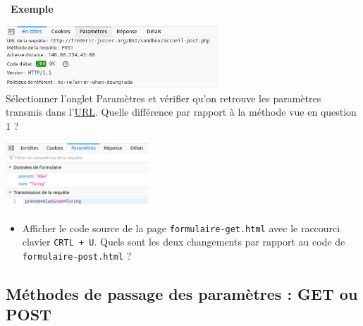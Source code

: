 \documentclass[
  11pt,
]{article}
\newcommand{\passthrough}[1]{#1}
\providecommand{\tightlist}{%
  \setlength{\itemsep}{0pt}\setlength{\parskip}{0pt}}
\newcounter{exple}
\newenvironment{exemple}[1]
{\par \medskip   \addtocounter{exple}{1} \noindent  
\begin{bclogo}[arrondi =0.1,   noborder = true, logo=\bclampe, marge=4]{~\textbf{Exemple} \textbf{\theexple} {\itshape #1} }  \par}
{
\end{bclogo}
 \par \bigskip }
\begin{document}
\begin{exemple}{}
\begin{enumerate}
  \includegraphics[width=0.6\textwidth,height=\textheight]{images/entete-post.png}\\

  Sélectionner l'onglet Paramètres et vérifier qu'on retrouve les
  paramètres transmis dans
  l'\href{https://developer.mozilla.org/fr/docs/Glossaire/URL}{URL}.
  Quelle différence par rapport à la méthode vue en question 1 ?

  \includegraphics[width=0.4\textwidth,height=\textheight]{images/parametres2.png}\\

  \begin{itemize}
  \tightlist
  \item
    Afficher le code source de la page
    \passthrough{\lstinline!formulaire-get.html!} avec le raccourci
    clavier \passthrough{\lstinline!CRTL + U!}. Quels sont les deux
    changements par rapport au code de
    \passthrough{\lstinline!formulaire-post.html!} ?
  \end{itemize}
\end{enumerate}

\end{exemple}

\hypertarget{muxe9thodes-de-passage-des-paramuxe8tres-get-ou-post}{%
\subsection{Méthodes de passage des paramètres : GET ou
POST}\label{muxe9thodes-de-passage-des-paramuxe8tres-get-ou-post}}
\end{document}
